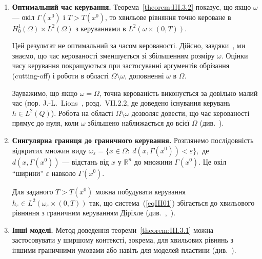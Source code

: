 \begin{enumerate}
\begin{enumerate}
\item \textbf{Оптимальний час керування.} Теорема~\ref{theorem:III.3.2} показує, що якщо $\omega$ — окіл $\Gamma(x^0)$ і $T > T(x^0)$, то хвильове рівняння точно кероване в $H^1_{0}(\Omega) \times L^2(\Omega)$ з керуваннями в $L^2(\omega \times (0,T))$.

Цей результат не оптимальний за часом керованості. Дійсно, завдяки~\cite{bardos1992sharp}, ми знаємо, що час керованості зменшується зі збільшенням розміру $\omega$. Оцінки часу керування покращуються при застосуванні аргументів обрізання (cutting-off) і роботи в області $\Omega \setminus \omega$, доповненні $\omega$ в $\Omega$.

Зауважимо, що якщо $\omega = \Omega$, точна керованість виконується за довільно малий час (пор. J.-L.~Lions~\cite{lions1988controlabilite}, розд.~VII.2.2, де доведено існування керувань $h \in L^2(Q)$). Робота на області $\Omega \setminus \omega$ дозволяє довести, що час керованості прямує до нуля, коли $\omega$ збільшено наближається до всієї $\Omega$ (див.~\cite{kim1992exact}).


\item \textbf{Сингулярна границя до граничного керування.} Розглянемо послідовність відкритих множин виду
$
\omega_\varepsilon = \{x \in \Omega:\ d(x, \Gamma(x^0)) < \varepsilon\},
$
де $d(x, \Gamma(x^0))$ — відстань від $x$ у $\mathbb{R}^n$ до множини $\Gamma(x^0)$. Це окіл ``ширини'' $\varepsilon$ навколо $\Gamma(x^0)$.

Для заданого $T>T(x^0)$ можна побудувати керування $h_\varepsilon \in L^2(\omega_\varepsilon \times (0,T))$ так, що система~(\ref{eqIII01}) збігається до хвильового рівняння з граничним керуванням Діріхле (див.~\cite{fabre1990comportement},~\cite{fabre1990equation}).


\item \textbf{Інші моделі.} Метод доведення теореми~\ref{theorem:III.3.1} можна застосовувати у ширшому контексті, зокрема, для хвильових рівнянь з іншими граничними умовами або навіть для моделей пластини (див.~\cite{zuazua1988controlabilite}).


\end{enumerate}
\end{enumerate}
